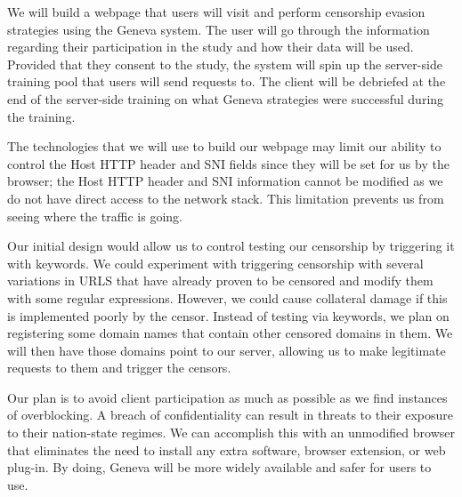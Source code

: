 
We will build a webpage that users will visit and perform censorship evasion strategies using the Geneva system. The user will go through the information regarding their participation in the study and how their data will be used. Provided that they consent to the study, the system will spin up the server-side training pool that users will send requests to. The client will be debriefed at the end of the server-side training on what Geneva strategies were successful during the training. 

The technologies that we will use to build our webpage may limit our ability to control the Host HTTP header and SNI fields since they will be set for us by the browser; the Host HTTP header and SNI information cannot be modified as we do not have direct access to the network stack. This limitation prevents us from seeing where the traffic is going. 

Our initial design would allow us to control testing our censorship by triggering it with keywords. We could experiment with triggering censorship with several variations in URLS that have already proven to be censored and modify them with some regular expressions. However, we could cause collateral damage if this is implemented poorly by the censor. Instead of testing via keywords, we plan on registering some domain names that contain other censored domains in them. We will then have those domains point to our server, allowing us to make legitimate requests to them and trigger the censors.

Our plan is to avoid client participation as much as possible as we find instances of overblocking. A breach of confidentiality can result in threats to their exposure to their nation-state regimes. We can accomplish this with an unmodified browser that eliminates the need to install any extra software, browser extension, or web plug-in. By doing, Geneva will be more widely available and safer for users to use.
